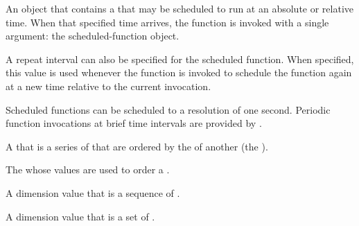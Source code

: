 \begin{glossary-list}

%
%
%
%
An object that contains a  that may be scheduled to run at an
absolute or relative time. When that specified time arrives, the function
is invoked with a single argument: the scheduled-function object.

A repeat interval can also be specified for the scheduled
function. When specified, this value is used whenever the function is
invoked to schedule the function again at a new time relative to the
current invocation.

Scheduled functions can be scheduled to a resolution of one second.  Periodic
function invocations at brief time intervals are provided by
.


%
% 
% 
%
A  that is a series of  that
are ordered by the  of another  (the
).


% 
% 
% 
%
The  whose values are used to order a
.


% 
% 
%
A dimension value that is a sequence of .


% 
% 
%
A dimension value that is a set of .


\end{glossary-list}
